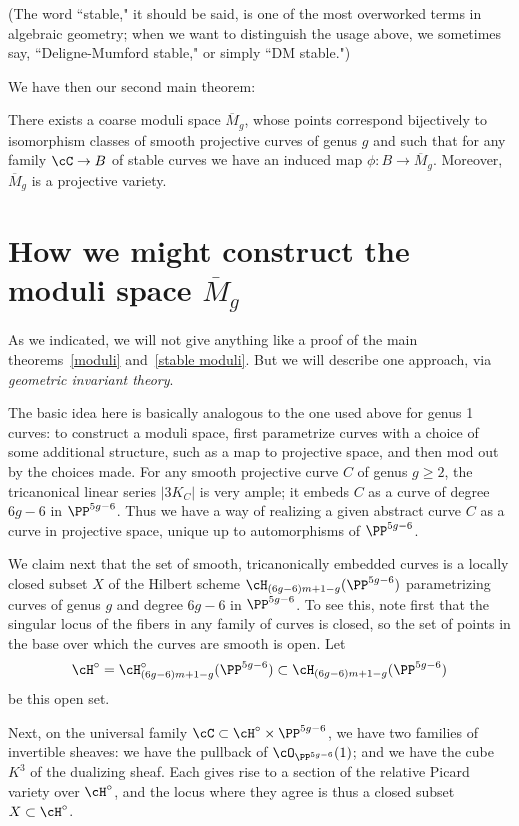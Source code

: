 (The word ``stable," it should be said, is one of the most overworked terms in algebraic geometry; when we want to distinguish the usage above, we sometimes say, ``Deligne-Mumford stable," or simply ``DM stable.")

We have then our second main theorem:

\begin{theorem}\label{stable moduli}
There exists a coarse moduli space $\overline M_g$, whose points correspond bijectively to isomorphism classes of smooth projective curves of genus $g$ and such that for any family $\cC \to B$ of stable curves we have an induced map $\phi : B \to \overline M_g$. Moreover, $\overline M_g$ is a projective variety.
\end{theorem}

\section{How we might construct the moduli space $\overline M_g$}

As we indicated, we will not give anything like a proof of the main theorems~\ref{moduli} and~\ref{stable moduli}. But we will describe one approach, via \emph{geometric invariant theory}.

The basic idea here is basically analogous to the one used above for genus 1 curves: to construct a moduli space, first parametrize curves with a choice of some additional structure, such as a map to projective space, and then mod out by the choices made. For any smooth projective curve $C$ of genus $g\geq 2$, the tricanonical linear series $|3K_C|$ is very ample; it embeds $C$ as a curve of degree $6g-6$ in $\PP^{5g-6}$. Thus we have a way of realizing a given abstract curve $C$ as a curve in projective space, unique up to automorphisms of $\PP^{5g-6}$.

We claim next that the set of smooth, tricanonically embedded curves is a locally closed subset $X$ of the Hilbert scheme $\cH_{(6g-6)m+1-g}(\PP^{5g-6})$ parametrizing curves of genus $g$ and degree $6g-6$ in $\PP^{5g-6}$. To see this, note first that the singular locus of the fibers in any family of curves is closed, so the set of points in the base over which the curves are smooth is open.  Let 
$$
\cH^\circ = \cH^\circ_{(6g-6)m+1-g}(\PP^{5g-6})\subset \cH_{(6g-6)m+1-g}(\PP^{5g-6})
$$
be this open set.

Next, on the universal family $\cC \subset \cH^\circ \times \PP^{5g-6}$, we have two families of invertible sheaves: we have the pullback of $\cO_{\PP^{5g-6}}(1)$; and we have the cube $K^3$ of the dualizing sheaf. Each gives rise to a section of the relative Picard variety over $\cH^\circ$, and the locus where they agree is thus a closed subset $X \subset \cH^\circ$.

